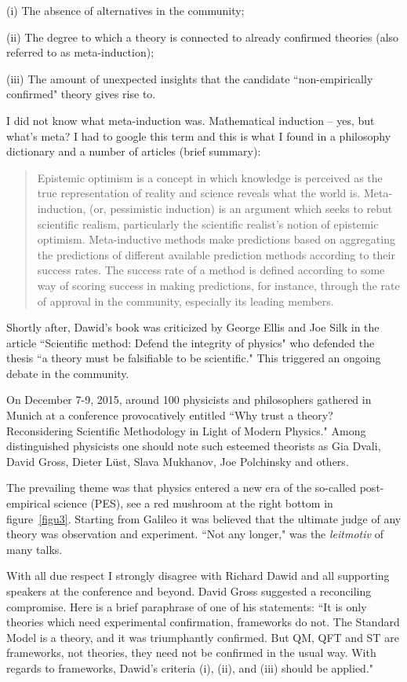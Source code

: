 \documentclass[epsfig,12pt]{article}
\begin{document}
(i) The absence of alternatives in the community;

(ii) The degree to which a theory is connected to already confirmed theories (also referred to as meta-induction);

(iii) The amount of unexpected insights that the candidate ``non-empirically confirmed" theory gives rise to. 

I did not know what meta-induction was. Mathematical induction -- yes, but what's meta? I had to google this term and this is what I found in a philosophy dictionary and a number of articles (brief summary):
\begin{quote}
Epistemic optimism is a concept in which 
knowledge is perceived as the true representation of reality and science reveals what the world is. 
Meta-induction, (or, pessimistic induction) is an argument which seeks to rebut 
scientific realism, particularly the scientific realist's notion of epistemic optimism. Meta-inductive methods make predictions based on aggregating the predictions of different available prediction methods according to their success rates. The success rate of a method is defined according to some way of scoring success in making predictions, for instance, through the rate of approval in the community, especially its leading members.
\end{quote}


Shortly after, Dawid's book was criticized by George Ellis and Joe Silk in the article ``Scientific method: Defend the integrity of physics" \cite{ES} who defended the thesis 
``a theory must be falsifiable to be scientific." This triggered an ongoing debate in the community.

On December 7-9, 2015,  around 100 physicists and philosophers gathered in Munich at a conference provocatively entitled  ``Why trust a theory? Reconsidering Scientific Methodology in Light of Modern Physics." Among distinguished physicists one should note such esteemed theorists as Gia Dvali, David Gross, Dieter L\"ust, Slava Mukhanov, Joe Polchinsky and others.

The prevailing theme was that physics entered a new era of the so-called post-empirical science (PES), see a red mushroom at the right bottom in 
figure~\ref{figu3}. 
Starting from Galileo it was believed that the ultimate judge of any theory was observation and experiment. ``Not any longer," was the {\em leitmotiv} of many talks. 

With all due respect I strongly disagree with Richard Dawid and all supporting speakers at the conference and beyond. David Gross suggested a reconciling compromise. Here is a brief paraphrase of one of his statements:  ``It is only theories which need experimental confirmation, frameworks do not. The Standard Model is a theory, and it was 
triumphantly confirmed. But QM, QFT and ST are frameworks, not theories, they need not be confirmed in the usual way. With regards to frameworks, Dawid's criteria (i), (ii), and (iii) should be applied." 
\end{document}

